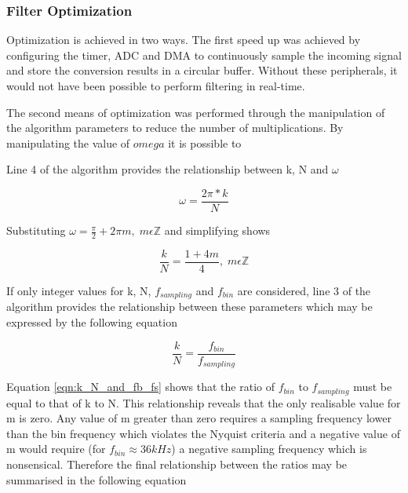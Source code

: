 \subsubsection{Filter Optimization}
\label{sec:filter_optimization_design}
Optimization is achieved in two ways. The first speed up was achieved by configuring the timer, ADC and DMA to continuously sample the incoming signal and store the conversion results in a circular buffer. Without these peripherals, it would not have been possible to perform filtering in real-time.

The second means of optimization was performed through the manipulation of the algorithm parameters to reduce the number of multiplications. By manipulating the value of $omega$ it is possible to 

Line 4 of the algorithm provides the relationship between k, N and $\omega$

\begin{equation}
	\omega = \frac{2\pi * k}{N}
\end{equation}

Substituting \(\omega = \frac{\pi}{2} + 2\pi m,\; m\epsilon \mathbb{Z}\) and simplifying shows

\begin{equation}
\label{eqn:k_N_constraint}
	\frac{k}{N} = \frac{1+4m}{4},\; m\epsilon \mathbb{Z}
\end{equation}

If only integer values for k, N, $f_{sampling}$ and $f_{bin}$ are considered, line 3 of the algorithm provides the relationship between these parameters which may be expressed by the following equation

\begin{equation}
\label{eqn:k_N_and_fb_fs}
	\frac{k}{N} = \frac{f_{bin}}{f_{sampling}}
\end{equation}


Equation \ref{eqn:k_N_and_fb_fs} shows that the ratio of $f_{bin}$ to $f_{sampling}$ must be equal to that of k to N. This relationship reveals that the only realisable value for m is zero. Any value of m greater than zero requires a sampling frequency lower than the bin frequency which violates the Nyquist criteria and a negative value of m would require (for $f_{bin} \approx 36kHz$) a negative sampling frequency which is nonsensical. Therefore the final relationship between the ratios may be summarised in the following equation

